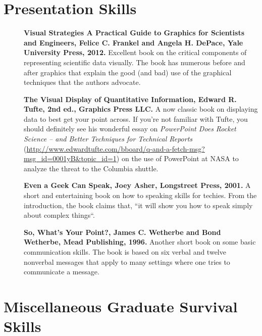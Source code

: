 \documentclass[11pt]{article}
\begin{document}
\section{Presentation Skills}

\begin{description}
\item[ ]  {\bf Visual Strategies A Practical Guide to Graphics for Scientists and Engineers, Felice C. Frankel and Angela H. DePace, Yale University Press, 2012.}  Excellent book on the critical components of representing scientific data visually.   The book has numerous before and after graphics that explain the good (and bad) use of the graphical techniques that the authors advocate.

\item[] {\bf The Visual Display of Quantitative Information, Edward R. Tufte, 2nd ed., Graphics Press LLC.} A now classic book on displaying data to best get your point across. If you're not familiar with Tufte, you should definitely see his wonderful essay on {\it PowerPoint Does Rocket Science -- and Better Techniques for Technical Reports} (\url{http://www.edwardtufte.com/bboard/q-and-a-fetch-msg?msg_id=0001yB&topic_id=1}) on the use of PowerPoint at NASA to analyze the threat to the Columbia shuttle.

\item[] {\bf Even a Geek Can Speak, Joey Asher, Longstreet Press, 2001.}  A short and entertaining book on how to speaking skills for techies.   From the introduction, the book claims that, ``it will show you how to speak simply about complex things``.
 
\item[] {\bf So, What's Your Point?,  James C. Wetherbe and Bond Wetherbe, Mead Publishing, 1996.}  Another short book on some basic communication skills.  The book is based on six verbal and twelve nonverbal messages that apply to many settings where one tries to communicate a message.
 
\end{description}

\section{Miscellaneous Graduate Survival Skills}
\end{document}
